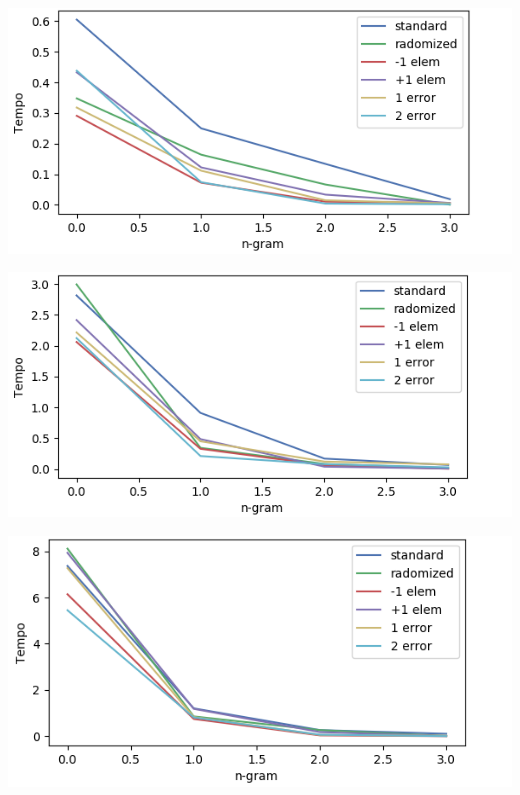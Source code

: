 \documentclass{article}
\begin{document}
\begin{center}
\begin{minipage}{0.8\linewidth}
    \includegraphics[width=\linewidth]{img/time_9K.png}
\end{minipage}%
\hfill
\begin{minipage}{0.8\linewidth}
    \includegraphics[width=\linewidth]{img/time_60K.png}
\end{minipage}%
\hfill
\begin{minipage}{0.8\linewidth}
    \includegraphics[width=\linewidth]{img/time_280K.png}
\end{minipage}%
\end{center}
\end{document}
